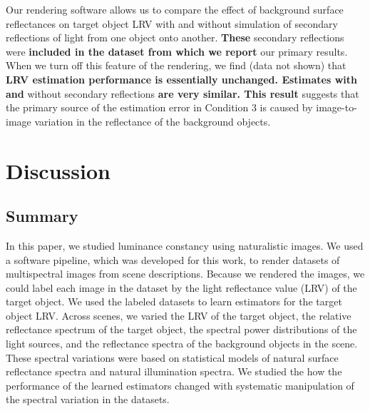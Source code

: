 \documentclass{jov}
\providecommand{\DIFaddtex}[1]{{\bf #1}} %
\providecommand{\DIFdeltex}[1]{} %
\providecommand{\DIFaddbegin}{} %
\providecommand{\DIFaddend}{} %
\providecommand{\DIFdelbegin}{} %
\providecommand{\DIFdelend}{} %
\providecommand{\DIFadd}[1]{\texorpdfstring{\DIFaddtex{#1}}{#1}} %
\providecommand{\DIFdel}[1]{\texorpdfstring{\DIFdeltex{#1}}{}} %
\newcommand{\DIFscaledelfig}{0.5}
\newlength{\DIFdelgraphicswidth} %
\newlength{\DIFdelgraphicsheight} %
\newcommand{\DIFaddincludegraphics}[2][]{{\color{blue}\fbox{\DIFOincludegraphics[#1]{#2}}}} %
\newcommand{\DIFdelincludegraphics}[2][]{%
\sbox{\DIFdelgraphicsbox}{\DIFOincludegraphics[#1]{#2}}%
\settoboxwidth{\DIFdelgraphicswidth}{\DIFdelgraphicsbox} %
\settoboxtotalheight{\DIFdelgraphicsheight}{\DIFdelgraphicsbox} %
\scalebox{\DIFscaledelfig}{%
\parbox[b]{\DIFdelgraphicswidth}{\usebox{\DIFdelgraphicsbox}\\[-\baselineskip] \rule{\DIFdelgraphicswidth}{0em}}\llap{\resizebox{\DIFdelgraphicswidth}{\DIFdelgraphicsheight}{%
\setlength{\unitlength}{\DIFdelgraphicswidth}%
\begin{picture}(1,1)%
\thicklines\linethickness{2pt} %
{\color[rgb]{1,0,0}\put(0,0){\framebox(1,1){}}}%
{\color[rgb]{1,0,0}\put(0,0){\line( 1,1){1}}}%
{\color[rgb]{1,0,0}\put(0,1){\line(1,-1){1}}}%
\end{picture}%
}\hspace*{3pt}}} %
} %
\DeclareRobustCommand{\DIFaddbegin}{\DIFOaddbegin \let\includegraphics\DIFaddincludegraphics} %
\DeclareRobustCommand{\DIFaddend}{\DIFOaddend \let\includegraphics\DIFOincludegraphics} %
\DeclareRobustCommand{\DIFdelbegin}{\DIFOdelbegin \let\includegraphics\DIFdelincludegraphics} %
\DeclareRobustCommand{\DIFdelend}{\DIFOaddend \let\includegraphics\DIFOincludegraphics} %
\begin{document}
Our rendering software allows us to compare the effect of background surface reflectances on target object LRV with and without simulation of secondary reflections of light from one object onto another. 
\DIFdelbegin \DIFdel{Such }\DIFdelend \DIFaddbegin \DIFadd{These }\DIFaddend secondary reflections were \DIFdelbegin \DIFdel{simulated for }\DIFdelend \DIFaddbegin \DIFadd{included in the dataset from which we report }\DIFaddend our primary results. 
When we turn off this feature of the rendering, we find (data not shown) that \DIFdelbegin \DIFdel{that the secondary reflections have minimal effect on LRV estimation :
the estimates }\DIFdelend \DIFaddbegin \DIFadd{LRV estimation performance is essentially unchanged. 
Estimates with and }\DIFaddend without secondary reflections \DIFdelbegin \DIFdel{were similarto those with reflections.
This }\DIFdelend \DIFaddbegin \DIFadd{are very similar.
This result }\DIFaddend suggests that the primary source of the estimation error in Condition 3 is caused by image-to-image variation in the reflectance of the background objects\DIFdelbegin \DIFdel{,
which in turn affects the normalized contrast representation of the target}\DIFdelend .

\section{Discussion} \label{Discussion}

\subsection{Summary}
In this paper, we studied luminance constancy using naturalistic images.
We used a software pipeline, which was developed for this work, to render datasets of multispectral images from scene descriptions.
Because we rendered the images, we could label each image in the dataset by the light reflectance value (LRV) of the target object.
We used the labeled datasets to learn estimators for the target object LRV.
Across scenes, we varied the LRV of the target object, the relative reflectance spectrum of the target object, 
the spectral power distributions of the light sources, and the reflectance spectra of the background objects in the scene.
These spectral variations were based on statistical models of natural surface reflectance spectra and natural illumination spectra.
We studied the how the performance of the learned estimators changed with systematic manipulation of the spectral variation in the datasets.
\end{document}
